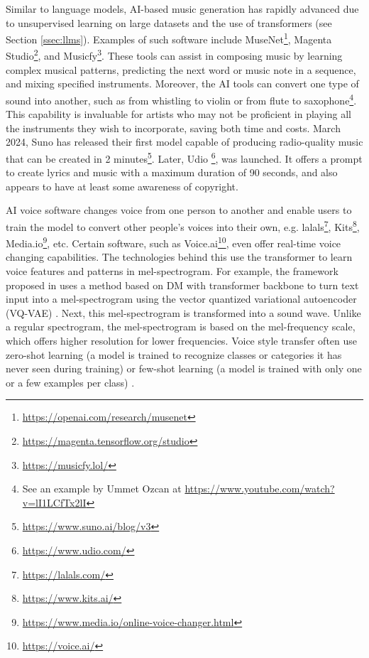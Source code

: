 \documentclass[11pt,a4paper]{article}
\begin{document}
Similar to language models, AI-based music generation has rapidly advanced due to unsupervised learning on large datasets and the use of transformers (see Section \ref{ssec:llms}). Examples of such software include MuseNet\footnote{\url{https://openai.com/research/musenet}}, Magenta Studio\footnote{\url{https://magenta.tensorflow.org/studio}}, and Musicfy\footnote{\url{https://musicfy.lol/}}. These tools can assist in composing music by learning complex musical patterns, predicting the next word or music note in a sequence, and mixing specified instruments. Moreover, the AI tools can convert one type of sound into another, such as from whistling to violin or from flute to saxophone\footnote{See an example by Ummet Ozcan at \url{https://www.youtube.com/watch?v=lI1LCfTx2lI}}. This capability is invaluable for artists who may not be proficient in playing all the instruments they wish to incorporate, saving both time and costs. March 2024, Suno has released their first model capable of producing radio-quality music that can be created in 2 minutes\footnote{\url{https://www.suno.ai/blog/v3}}. Later, Udio \footnote{\url{https://www.udio.com/}}, was launched. It offers a prompt to create lyrics and music with a maximum duration of 90 seconds, and also appears to have at least some awareness of copyright.

AI voice software changes voice from one person to another and enable users to train the model to convert other people's voices into their own, e.g. lalals\footnote{\url{https://lalals.com/}}, Kits\footnote{\url{https://www.kits.ai/}}, Media.io\footnote{\url{https://www.media.io/online-voice-changer.html}}, etc. Certain software, such as Voice.ai\footnote{\url{https://voice.ai/}}, even offer real-time voice changing capabilities. The technologies behind this use the transformer to learn voice features and patterns in mel-spectrogram. For example, the framework proposed in \cite{Yang:Diffsound:2023} uses a method based on DM with transformer backbone to turn text input into a mel-spectrogram using the vector quantized variational autoencoder (VQ-VAE) \cite{Oord:Neural:2017}. Next, this mel-spectrogram is transformed into a sound wave.  Unlike a regular spectrogram, the mel-spectrogram is based on the mel-frequency scale, which offers higher resolution for lower frequencies. Voice style transfer often use zero-shot learning (a model is trained to recognize classes or categories it has never seen during training) \cite{Huang:GenerSpeech:2022} or few-shot learning (a model is trained with only one or a few examples per class) \cite{Wang:One:2022}.
\end{document}
